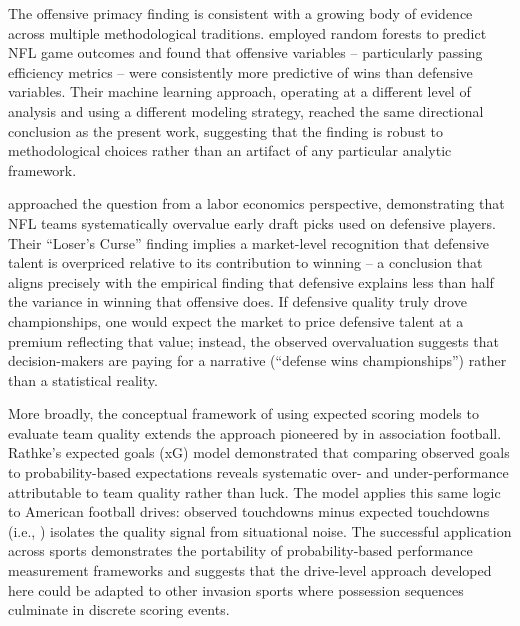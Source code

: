 The offensive primacy finding is consistent with a growing body of evidence
across multiple methodological traditions. \textcite{lock2014randomforests}
employed random forests to predict NFL game outcomes and found that offensive
variables -- particularly passing efficiency metrics -- were consistently more
predictive of wins than defensive variables. Their machine learning approach,
operating at a different level of analysis and using a different modeling
strategy, reached the same directional conclusion as the present work,
suggesting that the finding is robust to methodological choices rather than
an artifact of any particular analytic framework.

\textcite{massey2013loserscurse} approached the question from a labor
economics perspective, demonstrating that NFL teams systematically overvalue
early draft picks used on defensive players. Their ``Loser's Curse'' finding
implies a market-level recognition that defensive talent is overpriced
relative to its contribution to winning -- a conclusion that aligns precisely
with the empirical finding that defensive \xvoa{} explains less than half the
variance in winning that offensive \xvoa{} does. If defensive quality truly
drove championships, one would expect the market to price defensive talent
at a premium reflecting that value; instead, the observed overvaluation
suggests that decision-makers are paying for a narrative (``defense wins
championships'') rather than a statistical reality.

More broadly, the conceptual framework of using expected scoring models to
evaluate team quality extends the approach pioneered by
\textcite{rathke2017expectedgoals} in association football. Rathke's expected
goals (xG) model demonstrated that comparing observed goals to
probability-based expectations reveals systematic over- and under-performance
attributable to team quality rather than luck. The \xscore{} model applies
this same logic to American football drives: observed touchdowns minus
expected touchdowns (i.e., \xvoa{}) isolates the quality signal from
situational noise. The successful application across sports demonstrates
the portability of probability-based performance measurement frameworks and
suggests that the drive-level approach developed here could be adapted to
other invasion sports where possession sequences culminate in discrete
scoring events.
